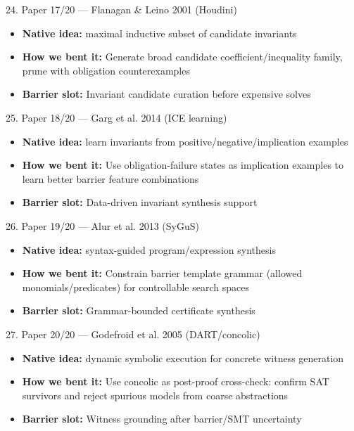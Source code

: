 \documentclass[aspectratio=169]{beamer}
\newcommand{\bendtag}[1]{\textcolor{blue!70!black}{\textbf{How we bent it:} #1}}
\newcommand{\slottag}[1]{\textcolor{teal!70!black}{\textbf{Barrier slot:} #1}}
\begin{document}
\begin{frame}[t,shrink=8]{24. Paper 17/20 — Flanagan \& Leino 2001 (Houdini)}
\begin{itemize}
  \item \textbf{Native idea:} maximal inductive subset of candidate invariants
  \item \bendtag{Generate broad candidate coefficient/inequality family, prune with obligation counterexamples}
  \item \slottag{Invariant candidate curation before expensive solves}
\end{itemize}
\end{frame}

\begin{frame}[t,shrink=8]{25. Paper 18/20 — Garg et al. 2014 (ICE learning)}
\begin{itemize}
  \item \textbf{Native idea:} learn invariants from positive/negative/implication examples
  \item \bendtag{Use obligation-failure states as implication examples to learn better barrier feature combinations}
  \item \slottag{Data-driven invariant synthesis support}
\end{itemize}
\end{frame}

\begin{frame}[t,shrink=8]{26. Paper 19/20 — Alur et al. 2013 (SyGuS)}
\begin{itemize}
  \item \textbf{Native idea:} syntax-guided program/expression synthesis
  \item \bendtag{Constrain barrier template grammar (allowed monomials/predicates) for controllable search spaces}
  \item \slottag{Grammar-bounded certificate synthesis}
\end{itemize}
\end{frame}

\begin{frame}[t,shrink=8]{27. Paper 20/20 — Godefroid et al. 2005 (DART/concolic)}
\begin{itemize}
  \item \textbf{Native idea:} dynamic symbolic execution for concrete witness generation
  \item \bendtag{Use concolic as post-proof cross-check: confirm SAT survivors and reject spurious models from coarse abstractions}
  \item \slottag{Witness grounding after barrier/SMT uncertainty}
\end{itemize}
\end{frame}
\end{document}
